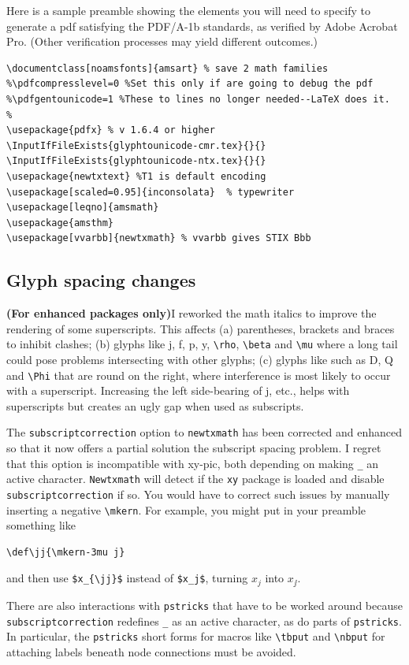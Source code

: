\documentclass[\fsc]{article}
\theoremstyle{oldplain}
\theoremstyle{plain}
\begin{document}
Here is a sample  preamble showing the elements you will need to specify to generate a pdf satisfying the PDF/A-1b standards, as verified by Adobe Acrobat Pro. (Other verification processes may yield different outcomes.)
\begin{verbatim}
\documentclass[noamsfonts]{amsart} % save 2 math families 
%\pdfcompresslevel=0 %Set this only if are going to debug the pdf
%\pdfgentounicode=1 %These to lines no longer needed--LaTeX does it.
% 
\usepackage{pdfx} % v 1.6.4 or higher
\InputIfFileExists{glyphtounicode-cmr.tex}{}{} 
\InputIfFileExists{glyphtounicode-ntx.tex}{}{}
\usepackage{newtxtext} %T1 is default encoding
\usepackage[scaled=0.95]{inconsolata}  % typewriter
\usepackage[leqno]{amsmath} 
\usepackage{amsthm}
\usepackage[vvarbb]{newtxmath} % vvarbb gives STIX Bbb
\end{verbatim} 


\subsection{Glyph spacing changes} \textbf{(For enhanced packages only)}I reworked the math italics to improve the rendering of some  superscripts. This affects (a)  parentheses, brackets and braces to inhibit clashes; (b) glyphs like j, f, p, y, \verb|\rho|,  \verb|\beta| and  \verb|\mu| where a long tail could pose problems intersecting with other glyphs; (c) glyphs like such as D, Q and \verb|\Phi| that are round on the right, where interference is most likely to occur with a superscript. Increasing the left side-bearing of j, etc., helps with superscripts but creates an ugly gap when used as subscripts.  


 The {\tt subscriptcorrection} option to {\tt newtxmath} has been corrected and enhanced  so that it now offers a partial solution the subscript spacing problem. I regret that this option is incompatible with xy-pic, both depending on making \verb|_| an active character. {\tt Newtxmath}  will detect if the {\tt xy} package is loaded and disable {\tt subscriptcorrection} if so. You would have to correct such issues by manually inserting a negative \verb|\mkern|. For example, you might put in your preamble something like
 \begin{verbatim}
\def\jj{\mkern-3mu j}
\end{verbatim}
and then use \verb|$x_{\jj}$| instead of \verb|$x_j$|, turning $x_j$ into $x_{\jj}$.

There are also interactions with {\tt pstricks} that have to be worked around because {\tt subscriptcorrection} redefines \verb|_| as an active character, as do parts of {\tt pstricks}. In particular, the {\tt pstricks} short forms for macros like \verb|\tbput| and \verb|\nbput| for attaching labels beneath node connections must be avoided.
\end{document}
